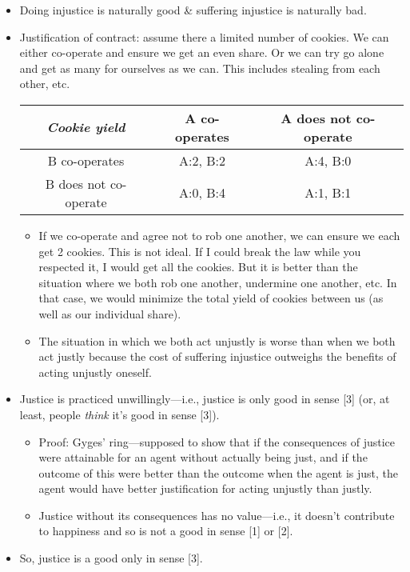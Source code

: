 \documentclass[oneside]{article}
\begin{document}
\begin{itemize}
\item{Doing injustice is naturally good \& suffering injustice is naturally bad.}
\item Justification of contract: assume there a limited number of cookies. We can either co-operate and ensure we get an even share. Or we can try go alone and get as many for ourselves as we can. This includes stealing from each other, etc. \begin{center}
\begin{tabular}{ |c|c|c| } 
 \hline
 \emph{Cookie yield}	 & A co-operates   & A does not co-operate  \\ \hline 
 B co-operates & A:2, B:2 & A:4, B:0 \\ 
 B does not co-operate & A:0, B:4 & A:1, B:1 \\ 
 \hline
\end{tabular}
\end{center}

\begin{itemize}
\item If we co-operate and agree not to rob one another, we can ensure we each get 2 cookies. This is not ideal. If I could break the law while you respected it, I would get all the cookies. But it is better than the situation where we both rob one another, undermine one another, etc. In that case, we would minimize the total yield of cookies between us (as well as our individual share).
\item{The situation in which we both act unjustly is worse than when we both act justly because the cost of suffering injustice outweighs the benefits of acting unjustly oneself.}
\end{itemize}
\item Justice is practiced unwillingly---i.e., justice is only good in sense [3] (or, at least, people \emph{think} it's good in sense [3]).
\begin{itemize}\item{Proof: Gyges' ring---supposed to show that if the consequences of justice were attainable for an agent without actually being just, and if the outcome of this were better than the outcome when the agent is just, the agent would have better justification for acting unjustly than justly.}
\item {Justice without its consequences has no value---i.e., it doesn't contribute to happiness and so is not a good in sense [1] or [2].}
\end{itemize}
\item So, justice is a good only in sense [3]. 
\end{itemize}
\end{document}
